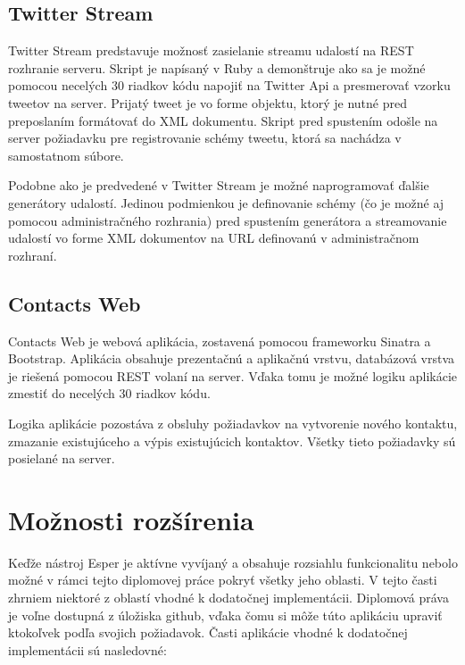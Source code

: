 	\subsection{Twitter Stream}
	Twitter Stream predstavuje možnosť zasielanie streamu udalostí na REST rozhranie serveru. Skript je napísaný v Ruby a demonštruje ako sa je možné pomocou necelých 30 riadkov kódu napojiť na Twitter Api a presmerovať vzorku tweetov na server. Prijatý tweet je vo forme objektu, ktorý je nutné pred preposlaním formátovať do XML dokumentu. Skript pred spustením odošle na server požiadavku pre registrovanie schémy tweetu, ktorá sa nachádza v samostatnom súbore.
	
	Podobne ako je predvedené v Twitter Stream je možné naprogramovať ďalšie generátory udalostí. Jedinou podmienkou je definovanie schémy (čo je možné aj pomocou administračného rozhrania) pred spustením generátora a streamovanie udalostí vo forme XML dokumentov na URL definovanú v administračnom rozhraní.
	
	\subsection{Contacts Web}
	Contacts Web je webová aplikácia, zostavená pomocou frameworku Sinatra a Bootstrap. Aplikácia obsahuje prezentačnú a aplikačnú vrstvu, databázová vrstva je riešená pomocou REST volaní na server. Vďaka tomu je možné logiku aplikácie zmestiť do necelých 30 riadkov kódu.
	
	Logika aplikácie pozostáva z obsluhy požiadavkov na vytvorenie nového kontaktu, zmazanie existujúceho a výpis existujúcich kontaktov. Všetky tieto požiadavky sú posielané na server.
	
	
\section{Možnosti rozšírenia}	
	Keďže nástroj Esper je aktívne vyvíjaný a obsahuje rozsiahlu funkcionalitu nebolo možné v rámci tejto diplomovej práce pokryť všetky jeho oblasti. V tejto časti zhrniem niektoré z oblastí vhodné k dodatočnej implementácii. Diplomová práva je voľne dostupná z úložiska github, vďaka čomu si môže túto aplikáciu upraviť ktokoľvek podľa svojich požiadavok. Časti aplikácie vhodné k dodatočnej implementácii sú nasledovné:

